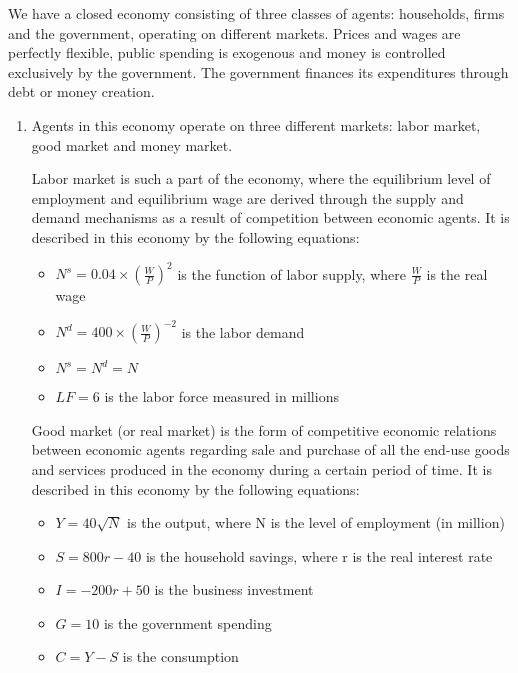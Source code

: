\documentclass[a4paper,12pt]{article} %
\begin{document}
 We have a closed economy consisting of three classes of agents: households, firms and
the government, operating on different markets. Prices and wages are perfectly flexible, public spending is exogenous and money is controlled exclusively by the government. The government finances its
expenditures through debt or money creation. 


\begin{enumerate}[label=\alph*)]


\item  Agents in this economy operate on three different markets: labor market, good market and money market.    

Labor market is    such a part of the economy, where  the equilibrium level of employment and equilibrium wage are derived through the supply and demand mechanisms  as a result of competition between economic agents. It is           described in this economy by the following equations: 


\begin{itemize}
\item $ N^{s} = 0.04 \times (\frac{W}{P})^{2} $ is  the function of labor supply, where $ \frac{W}{P} $ is the real wage 
\item $ N^{d}= 400 \times (\frac{W}{P})^{-2} $ is  the labor demand 
\item $  N^{s} = N^{d} = N $
\item  $ LF = 6 $ is the labor force measured in millions
\end{itemize}




Good market (or real market)  is   the  form of competitive economic relations between economic agents regarding sale and purchase of all the end-use goods and services produced in the economy during a certain period of time. It is described in this economy by the following equations: 
 
 \begin{itemize}
 	\item $ Y = 40 \sqrt{N} $ is the output, where  N is the level of employment (in million)
 	\item $ S = 800r -40 $ is the household savings, where  r  is the real interest rate
 	\item $  I = -200r + 50$ is  the business investment 
 	\item $ G = 10 $ is  the government spending 
 	\item $  C = Y - S $ is the consumption
 \end{itemize}
 


\end{enumerate}
\end{document}
